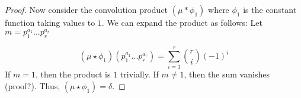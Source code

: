 \documentclass[Lang.tex]{subfiles}
\begin{document}
\begin{enumerate}
\begin{proof}
			Now consider the convolution product $ (\mu * \phi_1) $ where $\phi_1$ is the constant function taking values to $1$. We can expand the product as follows: Let $m = p_1^{a_1}...p_r^{a_r}$
			
			$$ (\mu \star \phi_1)(p_1^{a_1}...p_r^{a_r}) = \sum_{i = 1}^r {r \choose i} (-1)^i $$  If $m = 1$, then the product is $1$ trivially. If $m \neq 1$, then the sum vanishes (proof?). Thus, $(\mu \star \phi_1) = \delta$.
		\end{proof}
\end{enumerate}
\end{document}
